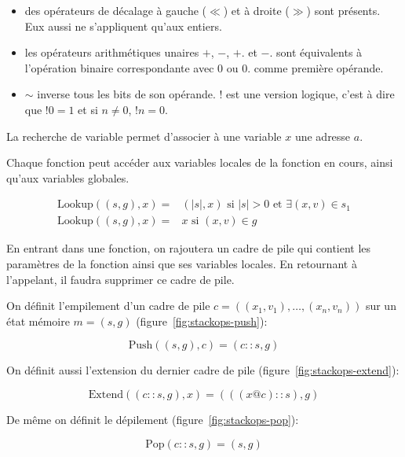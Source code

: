 \begin{itemize}
\item
  des opérateurs de décalage à gauche ($\ll$) et à droite ($\gg$) sont présents.
  Eux aussi ne s'appliquent qu'aux entiers.

\item
  les opérateurs arithmétiques unaires $+$, $-$, $+.$ et $-.$ sont équivalents à
  l'opération binaire correspondante avec $0$ ou $0.$ comme première opérande.

\item
  $\sim$ inverse tous les bits de son opérande. $!$ est une version logique,
  c'est à dire que $!0 = 1$ et si $n ≠ 0$, $!n = 0$.
\end{itemize}


\begin{definition}

  La recherche de variable permet d'associer à une variable $x$ une adresse $a$.

  Chaque fonction peut accéder aux variables locales de la fonction en cours,
  ainsi qu'aux variables globales.

  \begin{align*}
    \mathrm{Lookup} ((s, g), x) = & (|s|, x)
                                    \mbox{ si }|s| > 0
                                    \mbox{ et }∃ (x, v) ∈ s_1 \\
    \mathrm{Lookup} ((s, g), x) = & x \mbox{ si } (x, v) ∈ g
  \end{align*}

\end{definition}

En entrant dans une fonction, on rajoutera un cadre de pile qui contient les
paramètres de la fonction ainsi que ses variables locales. En retournant à
l'appelant, il faudra supprimer ce cadre de pile.

\begin{definition}

  On définit l'empilement d'un cadre de pile $c = ((x_1, v_1), …, (x_n, v_n))$
  sur un état mémoire $m = (s, g)$ (figure~\ref{fig:stackops-push}):

  \[
    \mathrm{Push}((s, g), c) = (c::s, g)
  \]

  On définit aussi l'extension du dernier cadre de pile
  (figure~\ref{fig:stackops-extend}):

  \[
    \mathrm{Extend}((c::s, g), x) = (((x @ c) :: s), g)
  \]

  De même on définit le dépilement (figure~\ref{fig:stackops-pop}):

  \[
    \mathrm{Pop}(c::s, g) = (s, g)
  \]

\end{definition}

